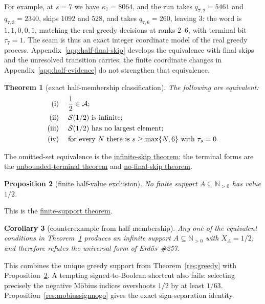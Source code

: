 \documentclass[11pt]{article}
\newcommand{\commit}{ebc98ee71f6819bd9fe344a0bb343542c604e533}
\newcommand{\repobase}{https://github.com/wcook04/plectis-lean-erdos249-257/blob/\commit}
\newcommand{\PK}{Erdos249257}
\newcommand{\lword}[4]{\href{\repobase/\PK/#1\#L#2}{#4}}
\newtheorem{theorem}{Theorem}[section]
\newtheorem{proposition}[theorem]{Proposition}
\newtheorem{corollary}[theorem]{Corollary}
\theoremstyle{definition}
\theoremstyle{remark}
\newcommand{\Npos}{\mathbb{N}_{>0}}
\begin{document}
\noindent For example, at \(s=7\) we have \(\kappa_7=8064\), and the run takes
\(q_{7,2}=5461\)
and \(q_{7,3}=2340\), skips \(1092\) and \(528\), and takes
\(q_{7,6}=260\), leaving \(3\): the word is \(1,1,0,0,1\), matching the
real greedy decisions at ranks \(2\)--\(6\), with terminal bit
\(\tau_7=1\).  The seam
is thus an exact integer coordinate model of the real greedy process.
Appendix~\ref{app:half-final-skip} develops the equivalence with
final skips and the unresolved transition carries; the finite coordinate changes in
Appendix~\ref{app:half-evidence} do not strengthen that equivalence.

\begin{theorem}[exact half-membership classification]\label{res:halfmembership}
The following are equivalent:
\[
\begin{aligned}
\textup{(i)}\;&\quad \frac12\in\mathcal A;\\
\textup{(ii)}\;&\quad \mathcal S(1/2)\ \text{is infinite};\\
\textup{(iii)}\;&\quad \mathcal S(1/2)\ \text{has no largest element};\\
\textup{(iv)}\;&\quad
  \text{for every }N\text{ there is }s\geq\max\{N,6\}
  \text{ with }\tau_s=0.
\end{aligned}
\]
\end{theorem}
\noindent The omitted-set equivalence is the
\lword{GreedyAchievementSet.lean}{2514}{half_mem_mersenneAchievementSet_iff_greedySkippedSupport_infinite}{infinite-skip theorem};
the terminal forms are the
\lword{HalfCylinderHalfMembershipClassification.lean}{126}{half_mem_mersenneAchievementSet_iff_unboundedTerminalFalse}{unbounded-terminal theorem}
and
\lword{HalfCylinderHalfMembershipClassification.lean}{235}{half_mem_mersenneAchievementSet_iff_no_lastHalfGreedySkip}{no-final-skip theorem}.

\begin{proposition}[finite half-value exclusion]\label{res:nofinitehalf}
No finite support \(A\subseteq\Npos\) has value \(1/2\).
\end{proposition}
\noindent This is the
\lword{HalfCarryReachability.lean}{589}{finite_boolSupport_ne_half}{finite-support theorem}.

\begin{corollary}[counterexample from half-membership]\label{res:halfcounterexample}
Any one of the equivalent conditions in
Theorem~\ref{res:halfmembership} produces an infinite support
\(A\subseteq\Npos\) with \(X_A=1/2\), and therefore refutes the
universal form of Erd\H{o}s~\#257.
\end{corollary}
\noindent This combines the unique greedy support from
Theorem~\ref{res:greedy} with Proposition~\ref{res:nofinitehalf}.
A tempting signed-to-Boolean shortcut also fails: selecting precisely the
negative M\"obius indices overshoots \(1/2\) by at least \(1/63\).
Proposition~\ref{res:mobiussignnogo} gives the exact sign-separation identity.
\end{document}

